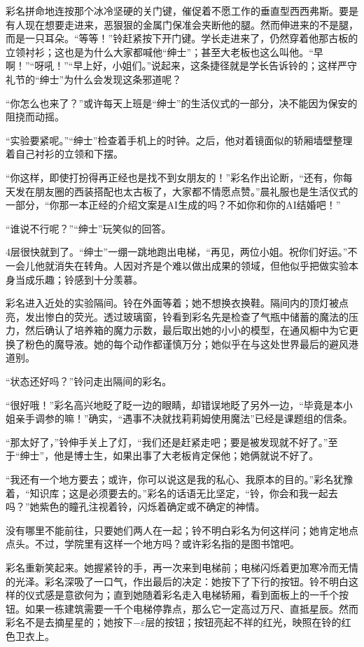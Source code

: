 彩名拼命地连按那个冰冷坚硬的关门键，催促着不愿工作的垂直型西西弗斯。要是有人现在想要走进来，恶狠狠的金属门保准会夹断他的腿。然而伸进来的不是腿，而是一只耳朵。“等等！”铃赶紧按下开门键。学长走进来了，仍然穿着他那古板的立领衬衫；这也是为什么大家都喊他“绅士”；甚至大老板也这么叫他。“早啊！”“呀吼！”“早上好，小姐们。”说起来，这条捷径就是学长告诉铃的；这样严守礼节的“绅士”为什么会发现这条邪道呢？

“你怎么也来了？”或许每天上班是“绅士”的生活仪式的一部分，决不能因为保安的阻挠而动摇。

“实验要紧呢。”“绅士”检查着手机上的时钟。之后，他对着镜面似的轿厢墙壁整理着自己衬衫的立领和下摆。

“你这样，即使打扮得再正经也是找不到女朋友的！”彩名作出论断，“还有，你每天发在朋友圈的西装搭配也太古板了，大家都不情愿点赞。”晨礼服也是生活仪式的一部分，“你那一本正经的介绍文案是AI生成的吗？不如你和你的AI结婚吧！”

“谁说不行呢？”“绅士”玩笑似的回答。

4层很快就到了。“绅士”一绷一跳地跑出电梯，“再见，两位小姐。祝你们好运。”不一会儿他就消失在转角。人因对齐是个难以做出成果的领域，但他似乎把做实验本身当成乐趣；铃感到十分羡慕。

彩名进入近处的实验隔间。铃在外面等着；她不想换衣换鞋。隔间内的顶灯被点亮，发出惨白的荧光。透过玻璃窗，铃看到彩名先是检查了气瓶中储蓄的魔法的压力，然后确认了培养箱的魔力示数，最后取出她的小小的模型，在通风橱中为它更换了粉色的魔导液。她的每个动作都谨慎万分；她似乎在与这处世界最后的避风港道别。

“状态还好吗？”铃问走出隔间的彩名。

“很好哦！”彩名高兴地眨了眨一边的眼睛，却错误地眨了另外一边，“毕竟是本小姐亲手调参的嘛！”确实，“遇事不决就找莉莉姆使用魔法”已经是课题组的信条。

“那太好了，”铃伸手关上了灯，“我们还是赶紧走吧；要是被发现就不好了。”至于“绅士”，他是博士生，如果出事了大老板肯定保他；她俩就说不好了。

“我还有一个地方要去；或许，你可以说这是我的私心、我原本的目的。”彩名犹豫着，“知识库；这是必须要去的。”彩名的话语无比坚定，“铃，你会和我一起去吗？”她紫色的瞳孔注视着铃，闪烁着确定或不确定的神情。

没有哪里不能前往，只要她们两人在一起；铃不明白彩名为何这样问；她肯定地点点头。不过，学院里有这样一个地方吗？或许彩名指的是图书馆吧。

彩名重新笑起来。她握紧铃的手，再一次来到电梯前；电梯闪烁着更加寒冷而无情的光泽。彩名深吸了一口气，作出最后的决定：她按下了下行的按钮。铃不明白这样的仪式感是意欲何为；直到她随着彩名走入电梯轿厢，看到面板上的一千个按钮。如果一栋建筑需要一千个电梯停靠点，那么它一定高过万尺、直抵星辰。然而彩名不是去摘星星的；她按下\(-\varepsilon\)层的按钮；按钮亮起不祥的红光，映照在铃的红色卫衣上。

